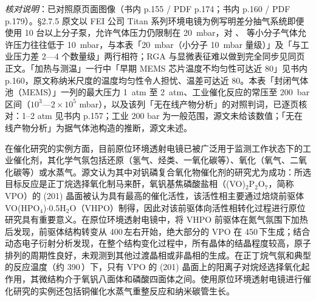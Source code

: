 \emph{核对说明}：已对照原页面图像（书内 p.155 / PDF p.174；书内 p.160 / PDF
p.179）。§2.7.5 原文以 FEI 公司 Titan 系列环境电镜为例写明差分抽气系统即便使用 10
台以上分子泵，允许气体压力仍限制在 \qty{20}{mbar}，对 、
等小分子气体允许压力往往低于 \qty{10}{mbar}，与本表「\qty{20}{mbar}（小分子
\qty{10}{mbar} 量级）」及「与工业压力差 2—4 个数量级」两行相符；RGA
与显微表征难以做到完全同步见同页正文。「加热与测温」一行中「早期 MEMS 芯片温度不均匀性可达近
\qty{80}{\degC}」见书内 p.160，原文称纳米尺度的温度均匀性令人担忧、温差可达近
\qty{80}{\degC}。本表「封闭气体池（MEMS）」一列的最大压力 \qty{1}{atm} 至
\qty{2}{atm}、工业催化反应的常压至 \qty{200}{bar}
区间（$10^{3}$—$2\times10^{5}$ mbar），以及该列「无在线产物分析」的对照判词，已逐页核对：1–2 atm 见书内 p.157；工业 200 bar 为一般范围，源文未给该数值；「无在线产物分析」为据气体池构造的推断，源文未述。


在催化研究的实例方面，目前原位环境透射电镜已被广泛用于监测工作状态下的工业催化剂，其化学气氛包括还原（氢气、烃类、一氧化碳等）、氧化（氧气、二氧化碳等）或水蒸气。源文认为其中对钒磷复合氧化物催化剂的研究尤为成功：所选目标反应是正丁烷选择氧化制马来酐，氧钒基焦磷酸盐相（(VO)$_2$P$_2$O$_7$，简称 VPO）的 (201) 晶面被认为具有最高的催化活性，该活性相主要通过焙烧前驱体 VO(HPO$_4$)$\cdot$0.5H$_2$O（VHPO）制得，因此对该前驱体向活性相转化过程进行原位研究具有重要意义。在原位环境透射电镜中，将 VHPO 前驱体在氮气氛围下加热后发现，前驱体结构转变从 400\,\degC 左右开始，绝大部分的 VPO 在 450\,\degC 下生成；结合动态电子衍射分析发现，在整个结构变化过程中，所有晶体的结晶程度较高，原子排列的周期性良好，未观测到其他过渡晶相或非晶相的生成。在正丁烷气氛和典型的反应温度（约 390\,\degC）下，只有 VPO 的 (201) 晶面上的阳离子对烷烃选择氧化起作用，其微结构介于氧钒八面体和磷酸四面体之间。使用原位环境透射电镜进行催化研究的实例还包括铜催化水蒸气重整反应和纳米碳管生长。

